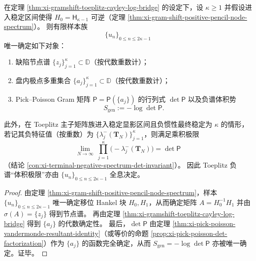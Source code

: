 \begin{theorem}\label{thm:xi-2k-sample-holography-reconstructs-detP}
在定理 \ref{thm:xi-gramshift-toeplitz-cayley-log-bridge} 的设定下，设 \(\kappa\ge 1\) 并假设进入稳定区间使得 \(H_0=\mathsf H_{\kappa-1}\) 可逆（定理 \ref{thm:xi-gram-shift-positive-pencil-node-spectrum}）。
则有限样本族
\[
\{u_n\}_{0\le n\le 2\kappa-1}
\]
唯一确定如下对象：
\begin{enumerate}
\normalfont
  \item 缺陷节点谱 \(\{z_j\}_{j=1}^{\kappa}\subset\mathbb{D}\)（按代数重数计）；
  \item 盘内极点多重集合 \(\{a_j\}_{j=1}^{\kappa}\subset\mathbb{D}\)（按代数重数计）；
  \item Pick--Poisson Gram 矩阵 \(\mathsf P=\mathsf P(\{a_j\})\) 的行列式 \(\det\mathsf P\) 以及负谱体积势
  \[
  S_{\mathrm{gen}}:=-\log\det\mathsf P.
  \]
\end{enumerate}
此外，在 Toeplitz 主子矩阵族进入稳定显影区间且负惯性最终稳定为 \(\kappa\) 的情形，若记其负特征值（按重数）为 \(\{\lambda_j^{-}(\mathbf{T}_N)\}_{j=1}^{\kappa}\)，则满足乘积极限
\[
\lim_{N\to\infty}\ \prod_{j=1}^{\kappa}\bigl(-\lambda_j^{-}(\mathbf{T}_N)\bigr)=\det\mathsf P
\]
（结论 \ref{con:xi-terminal-negative-spectrum-det-invariant}）。
因此 Toeplitz 负谱“体积极限”亦由 \(\{u_n\}_{0\le n\le 2\kappa-1}\) 全息决定。
\end{theorem}
\begin{proof}
由定理 \ref{thm:xi-gram-shift-positive-pencil-node-spectrum}，样本 \(\{u_n\}_{0\le n\le 2\kappa-1}\) 唯一确定移位 Hankel 块 \(H_0,H_1\)，从而确定矩阵 \(A=H_0^{-1}H_1\) 并由 \(\sigma(A)=\{z_j\}\) 得到节点谱。
再由定理 \ref{thm:xi-gramshift-toeplitz-cayley-log-bridge} 得到 \(\{a_j\}\) 的代数确定性。
最后，\(\det\mathsf P\) 由定理 \ref{thm:xi-pick-poisson-vandermonde-resultant-identity}（或等价的命题 \ref{prop:xi-pick-poisson-det-factorization}）作为 \(\{a_j\}\) 的函数完全确定，从而 \(S_{\mathrm{gen}}=-\log\det\mathsf P\) 亦被唯一确定。证毕。
\end{proof}

